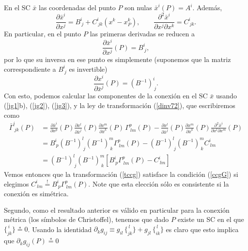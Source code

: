 En el SC $\bar{x}$ las coordenadas del punto $P$ son nulas $\bar{x}^i(P)=A^i$. Además,
\begin{equation}
\frac{\partial\bar{x}^i}{\partial x^j}=B^i_{\ j}+C^i_{\ jk}(x^k-x^k_P), \qquad \frac{\partial^2\bar{x}^i}{\partial x^j\partial x^k}=C^i_{\ jk}. \label{jg1}
\end{equation}
En particular, en el punto $P$ las primeras derivadas se reducen a
\begin{equation}\label{jg2}
\frac{\partial\bar{x}^i}{\partial x^j}(P)=B^i_{\ j},
\end{equation}
por lo que su inversa en ese punto es simplemente (suponemos que la matriz correspondiente a $B^i_{\ j}$ es invertible)
\begin{equation}\label{jg3}
\frac{\partial x^i}{\partial \bar{x}^j}(P)=(B^{-1})^i_{\ j}.
\end{equation}
Con esto, podemos calcular las componentes de la conexión en el SC $\bar{x}$ usando (\ref{jg1}b), (\ref{jg2}), (\ref{jg3}), y la ley de transformación (\ref{dinv72}), que escribiremos como
\begin{align}
\bar{\Gamma}_{\ jk}^i(P) &= \frac{\partial\bar{x}^i}{\partial x^p}(P)\frac{\partial
x^l}{\partial\bar{x}^j}(P)\frac{\partial x^m}{\partial\bar{x}^k}(P)\,
\Gamma_{\ lm}^p(P) -\frac{\partial x^l}{\partial \bar{x}^j}(P)\frac{\partial x^m}{\partial \bar{x}^k}(P)\frac{\partial^2\bar{x}^i}{\partial x^l \partial x^m}(P) \\
&= B^i_{\ p}(B^{-1})^l_{\ j}(B^{-1})^m_{\ k}\Gamma^p_{\ lm}(P)-(B^{-1})^l_{\ j}(B^{-1})^m_{\ k}C^i_{\ lm} \\
&= (B^{-1})^l_{\ j}(B^{-1})^m_{\ k}\left[B^i_{\ p}\Gamma^p_{\ lm}(P)-C^i_{\ lm}\right]
\end{align}
Vemos entonces que la transformación (\ref{tccg}) satisface la condición (\ref{ccgG}) si elegimos $C^i_{\ lm}\stackrel{!}{=}B^i_{\ p}\Gamma^p_{\ lm}(P)$. Note que esta elección sólo es consistente si la conexión es simétrica.

Segundo, como el resultado anterior es válido en particular para la conexión métrica (los símbolos de Christoffel), tenemos que dado $P$ existe un SC en el que $\{^{\,i}_{jk}\}\stackrel{*}{=}0$. Usando la identidad $\partial_kg_{ij}\equiv g_{il}\,\{^{\, l} _{jk}\}+g_{jl}\,\{^{\, l} _{ik}\}$ es claro que esto implica que $\partial_kg_{ij}(P)\stackrel{*}{=}0$


